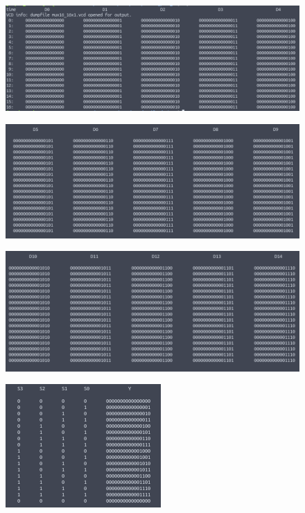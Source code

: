 \documentclass[11pt,a4paper]{article}
\begin{document}
\begin{enumerate}
\begin{enumerate}[label=(\alph*)]
\begin{figure}[h!]
\centering
\includegraphics[scale=0.7]{16_16x1MUX_61.png} 
\end{figure}
\begin{figure}[h!]
\centering
\includegraphics[scale=0.7]{16_16x1MUX_62.png} 
\end{figure}
\begin{figure}[h!]
\centering
\includegraphics[scale=0.7]{16_16x1MUX_63.png} 
\end{figure}
\begin{figure}[h!]
\centering
\includegraphics[scale=0.7]{16_16x1MUX_64.png} 
\end{figure}

\end{enumerate}
\end{enumerate}
\end{document}
